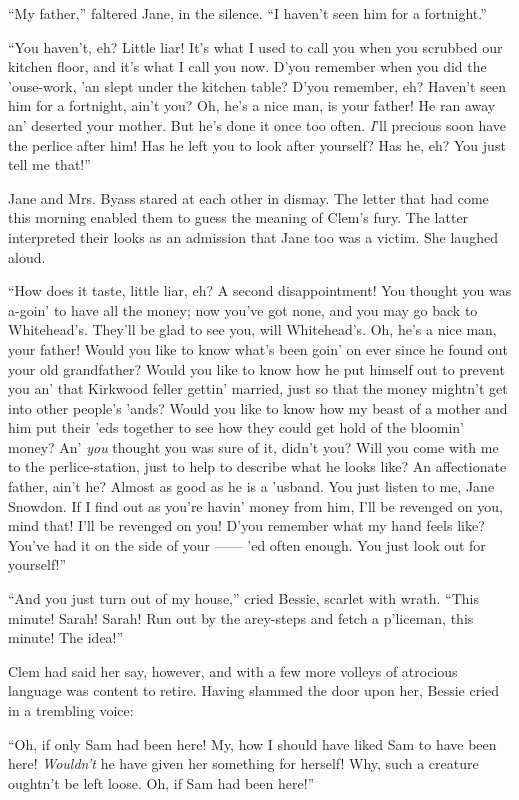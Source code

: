 ``My father,'' faltered Jane, in the silence. ``I haven't seen him for a
fortnight.''

``You haven't, eh? Little liar! It's what I used to call you when you
scrubbed our kitchen floor, and it's what I call you now. D'you remember
when you did the 'ouse-work, 'an slept under the kitchen table? D'you
remember, eh? Haven't seen him for a fortnight, ain't you? Oh, he's a
nice man, is your father! He ran away an' deserted your mother. But he's
done it once too often. \emph{I}'ll precious soon have the perlice after
him! Has he left you to look after yourself? Has he, eh? You just tell
me that!''

Jane and Mrs. Byass stared at each other in dismay. The letter that had
come this morning enabled them to guess the meaning of Clem's fury. The
latter interpreted their {}looks as an admission that Jane too was a
victim. She laughed aloud.

``How does it taste, little liar, eh? A second disappointment! You
thought you was a-goin' to have all the money; now you've got none, and
you may go back to Whitehead's. They'll be glad to see you, will
Whitehead's. Oh, he's a nice man, your father! Would you like to know
what's been goin' on ever since he found out your old grandfather? Would
you like to know how he put himself out to prevent you an' that Kirkwood
feller gettin' married, just so that the money mightn't get into other
people's 'ands? Would you like to know how my beast of a mother and him
put their 'eds together to see how they could get hold of the bloomin'
money? An' \emph{you} thought you was sure of it, didn't you? Will you
come with me to the perlice-station, just to help to describe what he
looks like? An affectionate father, ain't he? Almost as good as he is a
'usband. You just listen to me, Jane Snowdon. If I find out as you're
havin' money from him, I'll be revenged on you, mind that! I'll be
revenged on you! D'you remember what my hand feels {}like? You've had it
on the side of your {{------}} 'ed often enough. You just look out for
yourself!''

``And you just turn out of my house,'' cried Bessie, scarlet with wrath.
``This minute! Sarah! Sarah! Run out by the arey-steps and fetch a
p'liceman, this minute! The idea!''

Clem had said her say, however, and with a few more volleys of atrocious
language was content to retire. Having slammed the door upon her, Bessie
cried in a trembling voice:

``Oh, if only Sam had been here! My, how I should have liked Sam to have
been here! \emph{Wouldn't} he have given her something for herself! Why,
such a creature oughtn't be left loose. Oh, if Sam had been here!''

